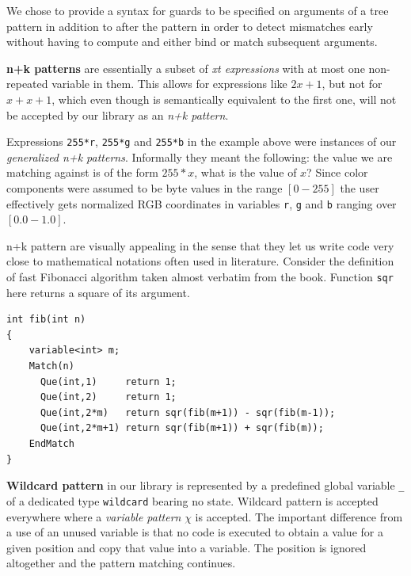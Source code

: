 \documentclass[preprint]{sigplanconf}
\makeatletter
\DeclareRobustCommand{\code}[1]{{\lstinline[breaklines=false,escapechar=@]{#1}}}
\makeatother
\begin{document}
We chose to provide a syntax for guards to be specified on arguments of a tree 
pattern in addition to after the pattern in order to detect mismatches early 
without having to compute and either bind or match subsequent arguments.

{\bf n+k patterns} are essentially a subset of \emph{xt expressions} with at most 
one non-repeated variable in them. This allows for expressions like $2x+1$, but 
not for $x+x+1$, which even though is semantically equivalent to the first one, 
will not be accepted by our library as an \emph{n+k pattern}.

Expressions \code{255*r}, \code{255*g} and \code{255*b} in the example above 
were instances of our \emph{generalized n+k patterns}. Informally they meant the 
following: the value we are matching against is of the form $255*x$, what is the 
value of $x$? Since color components were assumed to be byte values in the range 
$\left[0-255\right]$ the user effectively gets normalized RGB coordinates in 
variables \code{r}, \code{g} and \code{b} ranging over $\left[0.0-1.0\right]$.

n+k pattern are visually appealing in the sense that they let us write code very 
close to mathematical notations often used in literature. Consider the definition 
of fast Fibonacci algorithm taken almost verbatim from the book. Function 
\code{sqr} here returns a square of its argument.

\begin{lstlisting}[keepspaces,columns=flexible]
int fib(int n)
{
    variable<int> m;
    Match(n)
      Que(int,1)     return 1;
      Que(int,2)     return 1;
      Que(int,2*m)   return sqr(fib(m+1)) - sqr(fib(m-1));
      Que(int,2*m+1) return sqr(fib(m+1)) + sqr(fib(m));
    EndMatch
}
\end{lstlisting}

{\bf Wildcard pattern} in our library is represented by a predefined global 
variable \code{_} of a dedicated type \code{wildcard} bearing no state. 
Wildcard pattern is accepted everywhere where a \emph{variable pattern} $\chi$ 
is accepted. The important difference from a use of an unused variable is that 
no code is executed to obtain a value for a given position and copy that value 
into a variable. The position is ignored altogether and the pattern matching 
continues.
\end{document}
